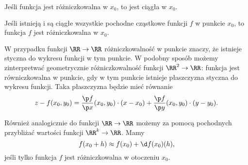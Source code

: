 \begin{theorem}
    Jeśli funkcja jest różniczkowalna w $x_0$, to jest ciągła w $x_0$.
\end{theorem}

\begin{theorem}
    Jeśli istnieją i są ciągłe wszystkie pochodne cząstkowe funkcji $f$ w punkcie $x_0$, to funkcja $f$ jest różniczkowalna w $x_0$.
\end{theorem}

W przypadku funkcji $\RR \to \RR$ różniczkowalność w punkcie znaczy, że istnieje styczna do wykresu funkcji w tym punkcie. W podobny sposób możemy zinterpretwać geometrycznie różniczkowalność funkcji $\RR^2 \to \RR$: funkcja jest równiczkowalna w punkcie, gdy w tym punkcie istnieje płaszczyzna styczna do wykresu funkcji. Taka płaszczyzna będzie mieć równanie
\begin{equation}
    z - f(x_0, y_0) = \frac{\p f}{\p x}(x_0, y_0) \cdot (x - x_0) + \frac{\p f}{\p y}(x_0, y_0) \cdot (y -y_0).
\end{equation}

Również analogicznie do funkcji $\RR \to \RR$ możemy za pomocą pochodnych przybliżać wartości funkcji $\RR^k \to \RR$. Mamy
\begin{equation}
    f(x_0 + h) \approx f(x_0) + \d f(x_0)(h),
\end{equation}
jeśli tylko funkcja $f$ jest różniczkowalna w otoczeniu $x_0$.